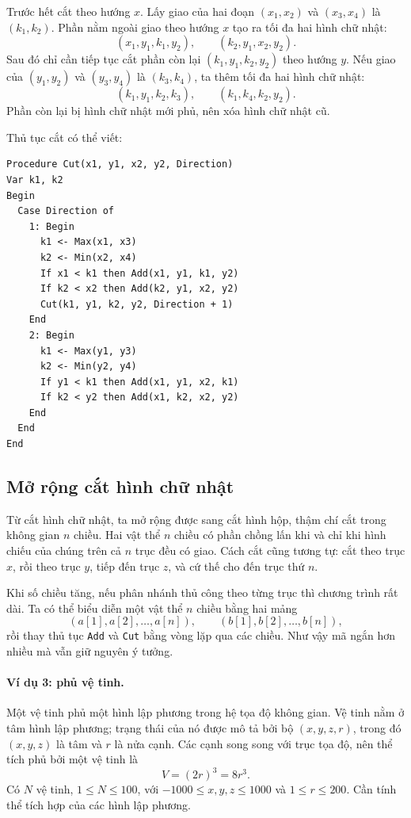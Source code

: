 \documentclass[11pt]{article}
\begin{document}
Trước hết cắt theo hướng $x$. Lấy giao của hai đoạn $(x_1,x_2)$ và
$(x_3,x_4)$ là $(k_1,k_2)$. Phần nằm ngoài giao theo hướng $x$ tạo ra tối đa
hai hình chữ nhật:
\[
  (x_1,y_1,k_1,y_2),\qquad (k_2,y_1,x_2,y_2).
\]
Sau đó chỉ cần tiếp tục cắt phần còn lại $(k_1,y_1,k_2,y_2)$ theo hướng $y$.
Nếu giao của $(y_1,y_2)$ và $(y_3,y_4)$ là $(k_3,k_4)$, ta thêm tối đa hai
hình chữ nhật:
\[
  (k_1,y_1,k_2,k_3),\qquad (k_1,k_4,k_2,y_2).
\]
Phần còn lại bị hình chữ nhật mới phủ, nên xóa hình chữ nhật cũ.

Thủ tục cắt có thể viết:
\begin{verbatim}
Procedure Cut(x1, y1, x2, y2, Direction)
Var k1, k2
Begin
  Case Direction of
    1: Begin
      k1 <- Max(x1, x3)
      k2 <- Min(x2, x4)
      If x1 < k1 then Add(x1, y1, k1, y2)
      If k2 < x2 then Add(k2, y1, x2, y2)
      Cut(k1, y1, k2, y2, Direction + 1)
    End
    2: Begin
      k1 <- Max(y1, y3)
      k2 <- Min(y2, y4)
      If y1 < k1 then Add(x1, y1, x2, k1)
      If k2 < y2 then Add(x1, k2, x2, y2)
    End
  End
End
\end{verbatim}

\subsection{Mở rộng cắt hình chữ nhật}

Từ cắt hình chữ nhật, ta mở rộng được sang cắt hình hộp, thậm chí cắt trong
không gian $n$ chiều. Hai vật thể $n$ chiều có phần chồng lấn khi và chỉ khi
hình chiếu của chúng trên cả $n$ trục đều có giao. Cách cắt cũng tương tự:
cắt theo trục $x$, rồi theo trục $y$, tiếp đến trục $z$, và cứ thế cho đến
trục thứ $n$.

Khi số chiều tăng, nếu phân nhánh thủ công theo từng trục thì chương trình
rất dài. Ta có thể biểu diễn một vật thể $n$ chiều bằng hai mảng
\[
  (a[1],a[2],\ldots,a[n]),\qquad (b[1],b[2],\ldots,b[n]),
\]
rồi thay thủ tục \texttt{Add} và \texttt{Cut} bằng vòng lặp qua các chiều.
Như vậy mã ngắn hơn nhiều mà vẫn giữ nguyên ý tưởng.

\paragraph{Ví dụ 3: phủ vệ tinh.}
Một vệ tinh phủ một hình lập phương trong hệ tọa độ không gian. Vệ tinh nằm ở
tâm hình lập phương; trạng thái của nó được mô tả bởi bộ $(x,y,z,r)$, trong
đó $(x,y,z)$ là tâm và $r$ là nửa cạnh. Các cạnh song song với trục tọa độ,
nên thể tích phủ bởi một vệ tinh là
\[
  V=(2r)^3=8r^3.
\]
Có $N$ vệ tinh, $1\le N\le 100$, với
$-1000\le x,y,z\le 1000$ và $1\le r\le 200$. Cần tính thể tích hợp của các
hình lập phương.
\end{document}
